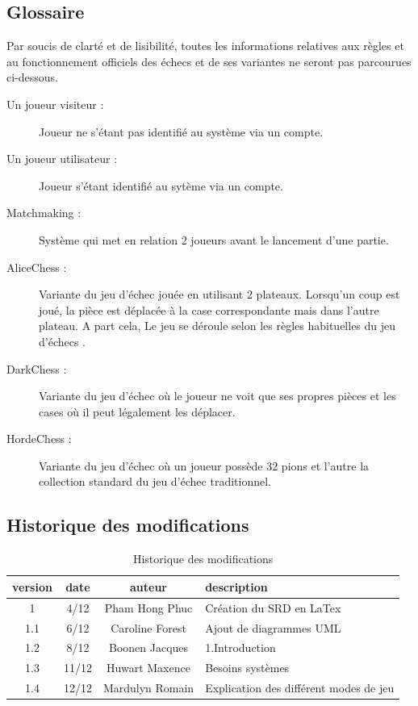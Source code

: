 \documentclass[10pt, a4paper]{article}
\begin{document}
			
			

		\subsection{Glossaire} Par soucis de clarté et de lisibilité, toutes les informations relatives aux règles et au fonctionnement officiels des échecs et de ses variantes ne seront pas parcourues ci-dessous. 
		\begin{description}
		\item[Un joueur visiteur :] Joueur ne s'étant pas identifié au système via un compte.
		\item[Un joueur utilisateur :] Joueur s'étant identifié au sytème via un compte.
		\item[Matchmaking :] Système qui met en relation 2 joueurs avant le lancement d'une partie.
		\item[AliceChess :] Variante du jeu d'échec jouée en utilisant 2 plateaux. Lorsqu'un coup est joué, la pièce est déplacée à la case correspondante mais dans l'autre plateau. A part cela, Le jeu se déroule selon les règles habituelles du jeu d'échecs .
		\item[DarkChess :] Variante du jeu d'échec où le joueur ne voit que ses propres pièces et les cases où il peut légalement les déplacer.
		\item[HordeChess :] Variante du jeu d'échec où un joueur possède 32 pions et l'autre la collection standard du jeu d'échec traditionnel.
		\end{description}

		\subsection{Historique des modifications}
		
		\begin{table}[h!]
			\centering
			\begin{tabular}{|c|c|c|p{50mm}|}
				\hline
				 \textbf{version} & \textbf{date} & \textbf{auteur}  & \textbf{description} \\ \hline
				 1 & 4/12 & Pham Hong Phuc & Création du SRD en LaTex\\ \hline
				 1.1 & 6/12 & Caroline Forest & Ajout de diagrammes UML\\ \hline
				 1.2 & 8/12 & Boonen Jacques & 1.Introduction\\ \hline 
				 1.3 & 11/12 & Huwart Maxence & Besoins systèmes\\ \hline
				 1.4 & 12/12 & Mardulyn Romain & Explication des différent modes de jeu\\ \hline
\end{tabular}
			\caption*{Historique des modifications}
			\end{table}
\clearpage
\end{document}
